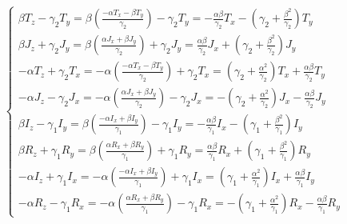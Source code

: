 \documentclass{article}
\begin{document}
\[
\left\{
\begin{array}{l}
\beta T_z - \gamma_2 T_y = \beta \left( \frac{-\alpha T_x - \beta T_y}{\gamma_2} \right) - \gamma_2 T_y 
= -\frac{\alpha \beta}{\gamma_2} T_x - \left( \gamma_2 + \frac{\beta^2}{\gamma_2} \right) T_y \\[1ex]

\beta J_z + \gamma_2 J_y = \beta \left( \frac{\alpha J_x + \beta J_y}{\gamma_2} \right) + \gamma_2 J_y 
= \frac{\alpha \beta}{\gamma_2} J_x + \left( \gamma_2 + \frac{\beta^2}{\gamma_2} \right) J_y \\[1ex]

-\alpha T_z + \gamma_2 T_x = -\alpha \left( \frac{-\alpha T_x - \beta T_y}{\gamma_2} \right) + \gamma_2 T_x 
= \left( \gamma_2 + \frac{\alpha^2}{\gamma_2} \right) T_x + \frac{\alpha \beta}{\gamma_2} T_y \\[1ex]

-\alpha J_z - \gamma_2 J_x = -\alpha \left( \frac{\alpha J_x + \beta J_y}{\gamma_2} \right) - \gamma_2 J_x 
= -\left( \gamma_2 + \frac{\alpha^2}{\gamma_2} \right) J_x - \frac{\alpha \beta}{\gamma_2} J_y \\[1ex]

\beta I_z - \gamma_1 I_y = \beta \left( \frac{-\alpha I_x + \beta I_y}{\gamma_1} \right) - \gamma_1 I_y 
= -\frac{\alpha \beta}{\gamma_1} I_x - \left( \gamma_1 + \frac{\beta^2}{\gamma_1} \right) I_y \\[1ex]

\beta R_z + \gamma_1 R_y = \beta \left( \frac{\alpha R_x + \beta R_y}{\gamma_1} \right) + \gamma_1 R_y 
= \frac{\alpha \beta}{\gamma_1} R_x + \left( \gamma_1 + \frac{\beta^2}{\gamma_1} \right) R_y \\[1ex]

-\alpha I_z + \gamma_1 I_x = -\alpha \left( \frac{-\alpha I_x + \beta I_y}{\gamma_1} \right) + \gamma_1 I_x 
= \left( \gamma_1 + \frac{\alpha^2}{\gamma_1} \right) I_x + \frac{\alpha \beta}{\gamma_1} I_y \\[1ex]

-\alpha R_z - \gamma_1 R_x = -\alpha \left( \frac{\alpha R_x + \beta R_y}{\gamma_1} \right) - \gamma_1 R_x 
= -\left( \gamma_1 + \frac{\alpha^2}{\gamma_1} \right) R_x - \frac{\alpha \beta}{\gamma_1} R_y
\end{array}
\right.
\]
\end{document}
